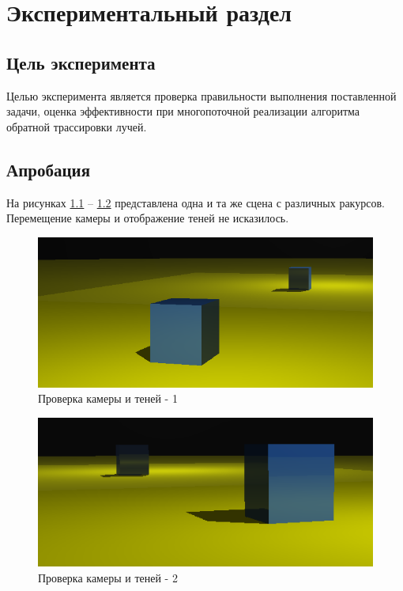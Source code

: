 \chapter{Экспериментальный раздел}

\section{Цель эксперимента}

Целью эксперимента является проверка правильности выполнения поставленной задачи, оценка эффективности при многопоточной реализации алгоритма обратной трассировки лучей.

\section{Апробация}

На рисунках \ref{shadows_1} -- \ref{shadows_2} представлена одна и та же сцена с различных ракурсов. Перемещение камеры и отображение теней не исказилось.

\begin{figure}[H]
	\begin{center}
		\includegraphics[scale=0.53]{assets/shadows_1.png}
	\end{center}
	\caption{Проверка камеры и теней - 1}
	\label{shadows_1}
\end{figure}

\begin{figure}[H]
	\begin{center}
		\includegraphics[scale=0.7]{assets/shadows_2.png}
	\end{center}
	\caption{Проверка камеры и теней - 2}
	\label{shadows_2}
\end{figure}

